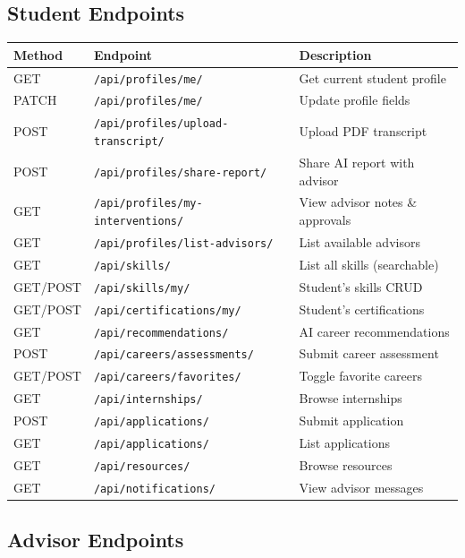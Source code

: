 \documentclass[12pt, a4paper]{article}
\begin{document}
\subsection{Student Endpoints}

{\small
\begin{longtable}{p{1.3cm}p{5.5cm}p{6.5cm}}
\toprule
\textbf{Method} & \textbf{Endpoint} & \textbf{Description} \\
\midrule
\endhead
GET & \texttt{/api/profiles/me/} & Get current student profile \\
PATCH & \texttt{/api/profiles/me/} & Update profile fields \\
POST & \texttt{/api/profiles/upload-transcript/} & Upload PDF transcript \\
POST & \texttt{/api/profiles/share-report/} & Share AI report with advisor \\
GET & \texttt{/api/profiles/my-interventions/} & View advisor notes \& approvals \\
GET & \texttt{/api/profiles/list-advisors/} & List available advisors \\
GET & \texttt{/api/skills/} & List all skills (searchable) \\
GET/POST & \texttt{/api/skills/my/} & Student's skills CRUD \\
GET/POST & \texttt{/api/certifications/my/} & Student's certifications \\
GET & \texttt{/api/recommendations/} & AI career recommendations \\
POST & \texttt{/api/careers/assessments/} & Submit career assessment \\
GET/POST & \texttt{/api/careers/favorites/} & Toggle favorite careers \\
GET & \texttt{/api/internships/} & Browse internships \\
POST & \texttt{/api/applications/} & Submit application \\
GET & \texttt{/api/applications/} & List applications \\
GET & \texttt{/api/resources/} & Browse resources \\
GET & \texttt{/api/notifications/} & View advisor messages \\
\bottomrule
\end{longtable}
}

\subsection{Advisor Endpoints}
\end{document}
